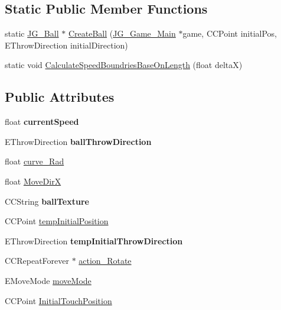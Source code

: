 \subsection*{Static Public Member Functions}
\begin{DoxyCompactItemize}
\item 
static \hyperlink{class_j_g___ball}{J\-G\-\_\-\-Ball} $\ast$ \hyperlink{class_j_g___ball_a7847a2c4fbfcf37d6e23b526d05c2f0e}{Create\-Ball} (\hyperlink{class_j_g___game___main}{J\-G\-\_\-\-Game\-\_\-\-Main} $\ast$game, C\-C\-Point initial\-Pos, E\-Throw\-Direction initial\-Direction)
\item 
static void \hyperlink{class_j_g___ball_a8023f3c38c257dd4430a5a01c519a289}{Calculate\-Speed\-Boundries\-Base\-On\-Length} (float delta\-X)
\end{DoxyCompactItemize}
\subsection*{Public Attributes}
\begin{DoxyCompactItemize}
\item 
\hypertarget{class_j_g___ball_a31660cccfe359fb7ae8448d0abf37e52}{float {\bfseries current\-Speed}}\label{class_j_g___ball_a31660cccfe359fb7ae8448d0abf37e52}

\item 
\hypertarget{class_j_g___ball_a743ed73473f38e9466f305c3f8efe995}{E\-Throw\-Direction {\bfseries ball\-Throw\-Direction}}\label{class_j_g___ball_a743ed73473f38e9466f305c3f8efe995}

\item 
float \hyperlink{class_j_g___ball_a32222cd24992fff289361884db472b23}{curve\-\_\-\-Rad}
\item 
float \hyperlink{class_j_g___ball_a790ad2df70ea24be8b2b01482c16c4f9}{Move\-Dir\-X}
\item 
\hypertarget{class_j_g___ball_a8e654f5b766060ae12aa22452f988882}{C\-C\-String {\bfseries ball\-Texture}}\label{class_j_g___ball_a8e654f5b766060ae12aa22452f988882}

\item 
C\-C\-Point \hyperlink{class_j_g___ball_a2cab0645b2eb4374fbfde0b0399c0e72}{temp\-Initial\-Position}
\item 
\hypertarget{class_j_g___ball_a358259dea815fa262327e0af48a6af3c}{E\-Throw\-Direction {\bfseries temp\-Initial\-Throw\-Direction}}\label{class_j_g___ball_a358259dea815fa262327e0af48a6af3c}

\item 
C\-C\-Repeat\-Forever $\ast$ \hyperlink{class_j_g___ball_a602558390080ce6d8cdfcfdbc09f7b12}{action\-\_\-\-Rotate}
\item 
E\-Move\-Mode \hyperlink{class_j_g___ball_a0ad0f2f4b8d03d63c879544111a24506}{move\-Mode}
\item 
C\-C\-Point \hyperlink{class_j_g___ball_aaffad54dc6e381ecaac2f3c7087e5dd7}{Initial\-Touch\-Position}
\end{DoxyCompactItemize}
